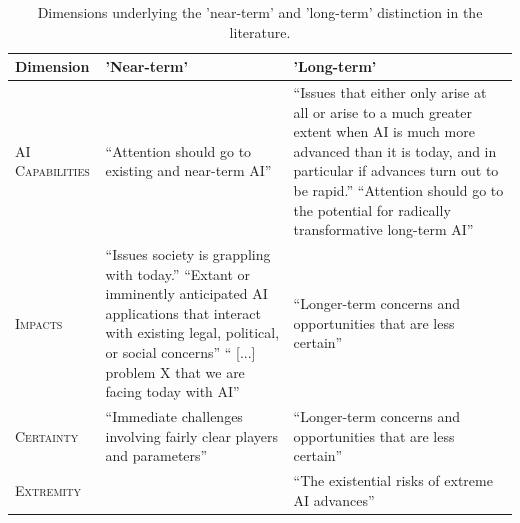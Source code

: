\documentclass[sigconf]{acmart}
\begin{document}
\begin{table}[t]
\begin{center}
 \begin{tabularx}{\textwidth} { 
  | >{\centering\arraybackslash\hsize=3cm}X 
  | >{\centering\arraybackslash}X 
  | >{\centering\arraybackslash}X |
  }
 \hline
 \large{\textbf{ Dimension }} & \large{\textbf{ 'Near-term'}} & \large{\textbf{ 'Long-term'}}\\ [0.5ex] 
 \hline \hline
\textsc{\newline\newline\newline AI Capabilities} & 
``Attention should go to existing and near-term AI'' \citep[p.2]{baum2018} & ``Issues that either only arise at all or arise to a much greater extent when AI is much more advanced than it is today, and in particular if advances turn out to be rapid.'' \cite{brundage_guide_2017}\newline\newline ``Attention should go to the potential for radically transformative long-term AI'' \citep[p.2]{baum2018}\\ 
 \hline
\textsc{\newline\newline\newline Impacts} & ``Issues society is grappling with today.'' \cite{brundage_guide_2017} \newline \newline ``Extant or imminently anticipated AI applications that interact with existing legal, political, or social concerns'' \citep[p.5]{parson_artificial_2019}\newline \newline`` [...] problem X that we are facing today with AI'' \cite{krakovna_is_2018} 
 & ``Longer-term concerns and opportunities that are less certain'' \citep[p.5]{cave_bridging_2019}

 \\ 
 \hline
\textsc{Certainty} & 
``Immediate challenges involving fairly clear players and parameters'' \citep[p.5]{cave_bridging_2019}
 & ``Longer-term concerns and opportunities that are less certain'' \citep[p.5]{cave_bridging_2019}
 \\ 
 \hline
\textsc{Extremity} &  & ``The existential risks of extreme AI advances'' \citep[p.5]{parson_artificial_2019}
 \\ 
 \hline
\end{tabularx}
\caption{Dimensions underlying the 'near-term' and 'long-term' distinction in the literature.}
\label{table1}
\end{center}
\end{table}
\end{document}
